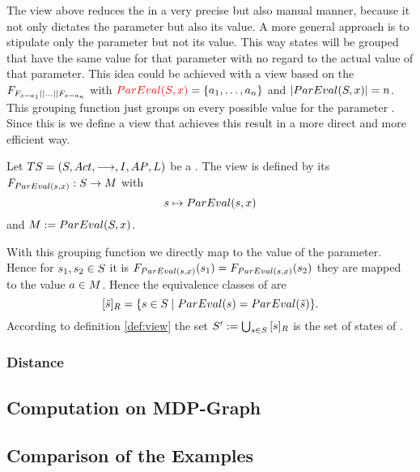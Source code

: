\documentclass[preview]{standalone}
\begin{document}
The view above reduces the \chosengraphtypeN in a very precise but also manual manner, because it not only dictates the parameter but also its value. A more general approach is to stipulate only the parameter but not its value. This way states will be grouped that have the same value for that parameter with no regard to the actual value of that parameter. This idea could be achieved with a view based on the \grpfctN $\grpfct_{\gfctparamvaluesopt[\paramval_1] \pll \dots \pll \gfctparamvaluesopt[\paramval_n]}$ with ${\color{red}{ParEval}({S}, {x})} = \{{a}_1, \dots, {a}_n\}$ and $|{ParEval}({S},{x})| = n$. This grouping function just groups on every possible value for the parameter \param. Since this is  we define a view that achieves this result in a more direct and more efficient way.

\begin{definition}
	Let ${TS} = {({S}, {Act}, {\longrightarrow}, {I}, {AP}, {L})}$ be a \chosengraphtypeN. The view \viewparamvaleq is defined by its \grpfctN ${{{F}}_{{ParEval}({s},{x})}} : {S} \to {\ensuremath{{M}}}$ with
	\[
	{s} \mapsto {ParEval}({s},{x})
	\]
	and ${{M}} := {ParEval}({S}, {x})$.
\end{definition}

With this grouping function we directly map to the value of the parameter. Hence for ${s}_1, {s}_2 \in {S}$ it is ${{{F}}_{{ParEval}({s},{x})}}({s}_1) = {{{F}}_{{ParEval}({s},{x})}}({s}_2)$ \iffN they are mapped to the value ${a} \in {\ensuremath{{M}}}$. Hence the equivalence classes of \eqrelview are
\[
{{[{\tilde{{s}}}]_{{R}}}} = \{ {s} \in {S} \mid {ParEval}({s}) = {ParEval}({\tilde{{s}}})\}.
\]
According to definition \ref{def:view} the set ${S}' := \bigcup_{{s} \in {S}} {{[{s}]_{{R}}}}$ is the set of states of \viewparamvaleq.

\subsubsection{Distance}
\subsection{Computation on MDP-Graph}




\subsection{Comparison of the Examples}
\end{document}
